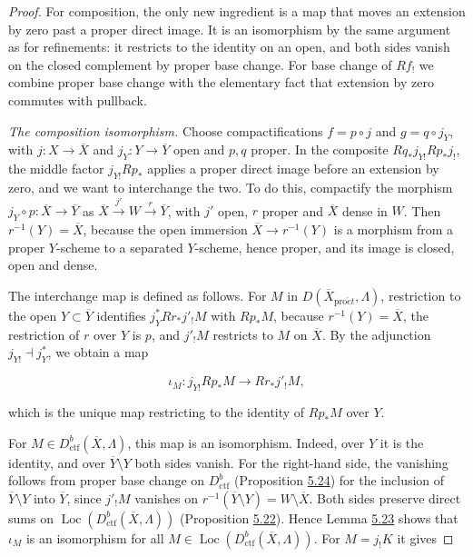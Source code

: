 \documentclass[11pt]{article}
\providecommand{\Loc}{}\renewcommand{\Loc}{\operatorname{Loc}}
\begin{document}
\begin{proof}[{Proof}]\label{bp497}%
For composition, the only new ingredient is a map that moves an extension by zero past a proper direct image. It is an isomorphism by the same argument as for refinements: it restricts to the identity on an open, and both sides vanish on the closed complement by proper base change. For base change of \(Rf_!\) we combine proper base change with the elementary fact that extension by zero commutes with pullback.

\emph{The composition isomorphism.} Choose compactifications \(f=p\circ j\) and \(g=q\circ j_Y\), with \(j:X\to\overline X\) and \(j_Y:Y\to\overline Y\) open and \(p,q\) proper. In the composite \(Rq_*j_{Y!}Rp_*j_!\), the middle factor \(j_{Y!}Rp_*\) applies a proper direct image before an extension by zero, and we want to interchange the two. To do this, compactify the morphism \(j_Y\circ p:\overline X\to\overline Y\) as \(\overline X\xrightarrow{j'}W\xrightarrow{r}\overline Y\), with \(j'\) open, \(r\) proper and \(\overline X\) dense in \(W\). Then \(r^{-1}(Y)=\overline X\), because the open immersion \(\overline X\to r^{-1}(Y)\) is a morphism from a proper \(Y\)-scheme to a separated \(Y\)-scheme, hence proper, and its image is closed, open and dense.

The interchange map is defined as follows. For \(M\) in \(D(\overline X_{\mathrm{pro}\acute{e}t},\Lambda)\), restriction to the open \(Y\subset\overline Y\) identifies \(j_Y^*Rr_*j'_!M\) with \(Rp_*M\), because \(r^{-1}(Y)=\overline X\), the restriction of \(r\) over \(Y\) is \(p\), and \(j'_!M\) restricts to \(M\) on \(\overline X\). By the adjunction \(j_{Y!}\dashv j_Y^*\), we obtain a map

\[
\iota_M:j_{Y!}Rp_*M\longrightarrow Rr_*j'_!M,
\tag{5.9}
\]

which is the unique map restricting to the identity of \(Rp_*M\) over \(Y\).

For \(M\in D^b_{\mathrm{ctf}}(\overline X,\Lambda)\), this map is an isomorphism. Indeed, over \(Y\) it is the identity, and over \(\overline Y\setminus Y\) both sides vanish. For the right-hand side, the vanishing follows from proper base change on \(D^b_{\mathrm{ctf}}\) (Proposition \hyperref[bp488]{5.24}) for the inclusion of \(\overline Y\setminus Y\) into \(\overline Y\), since \(j'_!M\) vanishes on \(r^{-1}(\overline Y\setminus Y)=W\setminus\overline X\). Both sides preserve direct sums on \(\Loc(D^b_{\mathrm{ctf}}(\overline X,\Lambda))\) (Proposition \hyperref[bp482]{5.22}). Hence Lemma \hyperref[bp485]{5.23} shows that \(\iota_M\) is an isomorphism for all \(M\in\Loc(D^b_{\mathrm{ctf}}(\overline X,\Lambda))\). For \(M=j_!K\) it gives


\end{proof}
\end{document}
